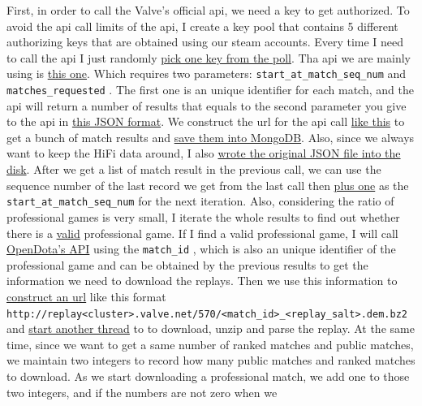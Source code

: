 \documentclass{article}
\newcommand{\codeinline}[1]{
    \texttt{#1}
}
\begin{document}
    First, in order to call the Valve's official api, we need a key to get authorized. To avoid the api call limits of the api, I create a key pool that contains 5 different authorizing keys that are obtained using our steam accounts. Every time I need to call the api I just randomly \href{https://github.com/Vopaaz/big-data-psg-lgd/blob/a9a285e0e29c0d9e56b41994875df830c7e7b51b/src/main/java/FetchStore/ValveAPI.java#L215}{pick one key from the poll}. Tha api we are mainly using is \href{https://wiki.teamfortress.com/wiki/WebAPI/GetMatchHistoryBySequenceNum}{this one}. Which requires two parameters: \codeinline{start_at_match_seq_num} and \codeinline{matches_requested}.
    The first one is an unique identifier for each match, and the api will return a number of results that equals to the second parameter you give to the api in \href{https://wiki.teamfortress.com/wiki/WebAPI/GetMatchDetails}{this JSON format}. We construct the url for the api call \href{https://github.com/Vopaaz/big-data-psg-lgd/blob/a9a285e0e29c0d9e56b41994875df830c7e7b51b/src/main/java/FetchStore/ValveAPI.java#L207-L230}{like this} to get a bunch of match results and \href{https://github.com/Vopaaz/big-data-psg-lgd/blob/a9a285e0e29c0d9e56b41994875df830c7e7b51b/src/main/java/FetchStore/ValveAPI.java#L238-L257}{save them into MongoDB}. Also, since we always want to keep the HiFi data around, I also \href{https://github.com/Vopaaz/big-data-psg-lgd/blob/a9a285e0e29c0d9e56b41994875df830c7e7b51b/src/main/java/FetchStore/ValveAPI.java#L289-L300}{wrote the original JSON file into the disk}. After we get a list of match result in the previous call, we can use the sequence number of the last record we get from the last call then \href{https://github.com/Vopaaz/big-data-psg-lgd/blob/a9a285e0e29c0d9e56b41994875df830c7e7b51b/src/main/java/FetchStore/ValveAPI.java#L268}{plus one} as the \codeinline{start_at_match_seq_num} for the next iteration. Also, considering the ratio of professional games is very small, I iterate the whole results to find out whether there is a \href{https://github.com/Vopaaz/big-data-psg-lgd/blob/a9a285e0e29c0d9e56b41994875df830c7e7b51b/src/main/java/FetchStore/ValveAPI.java#L146-L161}{valid} professional game. If I find a valid professional game, I will call \href{https://docs.opendota.com}{OpenDota's API} using the \codeinline{match_id}, which is also an unique identifier of the professional game and can be obtained by the previous results to get the information we need to download the replays. Then we use this information to \href{https://github.com/Vopaaz/big-data-psg-lgd/blob/a9a285e0e29c0d9e56b41994875df830c7e7b51b/src/main/java/FetchStore/OpendotaAPI.java#L17-L70}{construct an url} like this format \codeinline{http://replay<cluster>.valve.net/570/<match_id>_<replay_salt>.dem.bz2} and \href{https://github.com/Vopaaz/big-data-psg-lgd/blob/a9a285e0e29c0d9e56b41994875df830c7e7b51b/src/main/java/FetchStore/ValveAPI.java#L131-L144}{start another thread} to to download, unzip and parse the replay. At the same time, since we want to get a same number of ranked matches and public matches, we maintain two integers to record how many public matches and ranked matches to download. As we start downloading a professional match, we add one to those two integers, and if the numbers are not zero when we 
\end{document}

